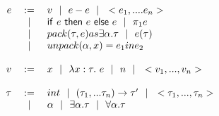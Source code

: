 \documentclass[10pt]{article}
\begin{document}
\[
\begin{array}{rcl}
e  &:=&  v \alt e-e \alt  < e_1, .... e_n >  \\
&\alt& \ife{e}{e}{e} \alt  \pi_1e  \\
&\alt&  pack ( \tau, e) \space as \space \exists \alpha. \tau \alt e(\tau)  \\
&\alt&  unpack ( \alpha, x) = e_1 in e_2   \\
\\ %
v  &:=&  x \alt \lamdefe{x:\tau}{e} \alt n \alt <v_1,...,v_n> \\
\\
\tau  &:=& int \alt \funct{(\tau_1,...\tau_n)}{\tau'} \alt <\tau_1,...,\tau_n>\\
&\alt&  \alpha \alt \exists \alpha.\tau \alt \forall \alpha.\tau \\
\end{array}
\]
                                                                    \vskip 0.2in
\end{document}
